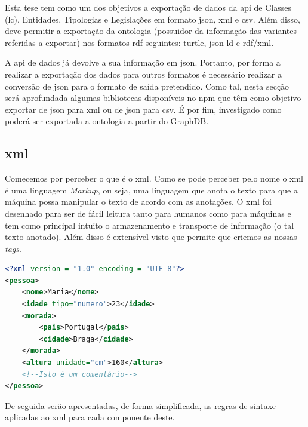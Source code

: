 Esta tese tem como um dos objetivos a exportação de dados da \acrshort{api} de Classes (\acrshort{lc}), Entidades, Tipologias e Legislações em formato \acrshort{json}, \acrshort{xml} e \acrshort{csv}. Além disso, deve permitir a exportação da ontologia (possuidor da informação das variantes referidas a exportar) nos formatos \acrshort{rdf} seguintes: \acrshort{turtle}, \acrshort{json-ld} e \acrshort{rdf}/\acrshort{xml}.

A \acrshort{api} de dados já devolve a sua informação em \acrshort{json}. Portanto, por forma a realizar a exportação dos dados para outros formatos é necessário realizar a conversão de \acrshort{json} para o formato de saída pretendido. Como tal, nesta secção será aprofundada algumas bibliotecas disponíveis no \acrshort{npm} que têm como objetivo exportar de \acrshort{json} para \acrshort{xml} ou de \acrshort{json} para \acrshort{csv}. É por fim, investigado como poderá ser exportada a ontologia a partir do GraphDB.

\subsection{\acrshort{xml}}

Comecemos por perceber o que é o \acrfull{xml}. Como se pode perceber pelo nome o \acrshort{xml} é uma linguagem \textit{Markup}, ou seja, uma linguagem que anota o texto para que a máquina possa manipular o texto de acordo com as anotações. O \acrshort{xml} foi desenhado para ser de fácil leitura tanto para humanos como para máquinas e tem como principal intuito o armazenamento e transporte de informação (o tal texto anotado). Além disso é extensível visto que permite que criemos as nossas \textit{tags}.

\begin{lstlisting}[language=xml, caption=Pequeno exemplo em \acrshort{xml}, label=exem:xmlEx]
<?xml version = "1.0" encoding = "UTF-8"?>
<pessoa>
    <nome>Maria</nome>
    <idade tipo="numero">23</idade>
    <morada>
        <pais>Portugal</pais>
        <cidade>Braga</cidade>
    </morada>
    <altura unidade="cm">160</altura>
    <!--Isto é um comentário-->
</pessoa>
\end{lstlisting}

De seguida serão apresentadas, de forma simplificada, as regras de sintaxe aplicadas ao \acrshort{xml} para cada componente deste.

